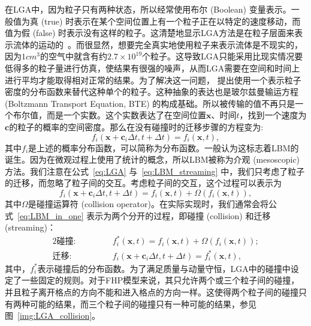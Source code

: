 在LGA中，因为粒子只有两种状态，所以经常使用布尔 (Boolean) 变量表示。一般值为真 (true) 时表示在某个空间位置上有一个粒子正在以特定的速度移动，而值为假 (false) 时表示没有这样的粒子。这清楚地显示LGA方法是在粒子层面来表示流体的运动的~\citep{wolf2004lattice}。而很显然，想要完全真实地使用粒子来表示流体是不现实的，因为$1cm^3$的空气中就含有约$2.7\times 10^{19}$个粒子。这导致LGA只能采用比现实情况要低得多的粒子量进行仿真，使结果有很强的噪声，从而LGA需要在空间和时间上进行平均才能取得相对正常的结果。为了解决这一问题，\citet{PhysRevLett.61.2332} 提出使用一个表示粒子密度的分布函数来替代这种单个的粒子。这种抽象的表达也是玻尔兹曼输运方程 (Boltzmann Transport Equation, BTE) 的构成基础。所以被传输的值不再只是一个布尔值，而是一个实数。这个实数表达了在空间位置$\mathbf{x}$、时间$t$，找到一个速度为$\mathbf{c}$的粒子的概率的空间密度。那么在没有碰撞时的迁移步骤的方程变为:
\begin{equation}
    f_{i}(\mathbf{x}+\mathbf{c}_i \Delta t,t+\Delta t)=f_{i}(\mathbf{x},t),
    \label{eq:LBM_streaming}
\end{equation}
其中$f_{i}$是上述的概率分布函数，可以简称为分布函数。一般认为这标志着LBM的诞生。因为在微观过程上使用了统计的概念，所以LBM被称为介观 (mesoscopic) 方法。我们注意在公式~\ref{eq:LGA} 与~\ref{eq:LBM_streaming} 中，我们只考虑了粒子的迁移，而忽略了粒子间的交互。考虑粒子间的交互，这个过程可以表示为
\begin{equation}
    f_{i}(\mathbf{x}+\mathbf{c}_i \Delta t,t+\Delta t)=f_{i}(\mathbf{x},t)+\Omega(f_{i}(\mathbf{x},t)),
    \label{eq:LBM_in_one}
\end{equation}
其中$\Omega$是碰撞运算符 (collision operator)。在实际实现时，我们通常会将公式~\ref{eq:LBM_in_one} 表示为两个分开的过程，即碰撞 (collision) 和迁移 (streaming)：
\begin{alignat}{2}
\textbf{碰撞:} & \quad\quad &&f_i^*(\boldsymbol{x}, t) =f_i(\boldsymbol{x}, t)+\Omega\left(f_i(\boldsymbol{x}, t)\right); \\
\textbf{迁移:} & &&f_i\left(\boldsymbol{x}+\mathbf{c}_i \Delta t, t+\Delta t\right) =f_i^*(\boldsymbol{x}, t),\label{eq:LBM_streaming_in_one}
\end{alignat}
其中，$f_i^*$表示碰撞后的分布函数。为了满足质量与动量守恒，LGA中的碰撞中设定了一些固定的规则。对于FHP模型来说，其只允许两个或三个粒子间的碰撞，并且粒子离开格点的方向不能和进入格点的方向一样。这使得两个粒子间的碰撞只有两种可能的结果，而三个粒子间的碰撞只有一种可能的结果，参见图~\ref{img:LGA_collision}。

